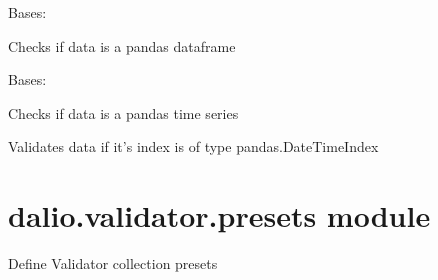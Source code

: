 \documentclass[letterpaper,10pt,english]{sphinxmanual}
\begin{document}
\begin{fulllineitems}
\label{\detokenize{dalio.validator:dalio.validator.pandas_val.IS_PD_DF}}
Bases: {\hyperref[\detokenize{dalio.validator:dalio.validator.base_val.IS_TYPE}]{}}

Checks if data is a pandas dataframe


\begin{fulllineitems}
\end{fulllineitems}


\end{fulllineitems}


\begin{fulllineitems}
\label{\detokenize{dalio.validator:dalio.validator.pandas_val.IS_PD_TS}}
Bases: {\hyperref[\detokenize{dalio.validator:dalio.validator.base_val.IS_TYPE}]{}}

Checks if data is a pandas time series

\begin{fulllineitems}
\label{\detokenize{dalio.validator:dalio.validator.pandas_val.IS_PD_TS.validate}}
Validates data if it’s index is of type pandas.DateTimeIndex

\end{fulllineitems}


\end{fulllineitems}



\section{dalio.validator.presets module}
\label{\detokenize{dalio.validator:module-dalio.validator.presets}}\label{\detokenize{dalio.validator:dalio-validator-presets-module}}
Define Validator collection presets
\end{document}
